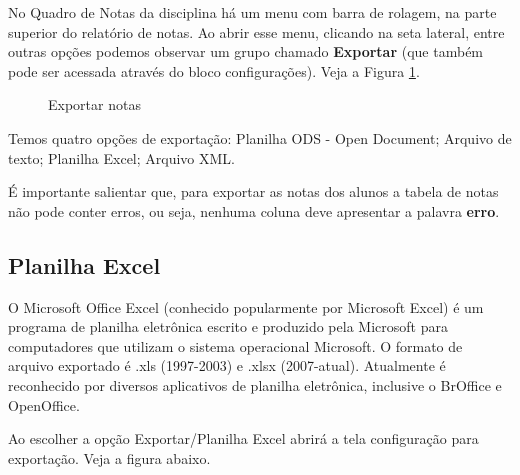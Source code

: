 No Quadro de Notas da disciplina há um menu com barra de rolagem, na parte superior do relatório de notas. Ao abrir esse menu, clicando na seta lateral, entre outras opções podemos observar um grupo chamado \textbf{Exportar} (que também pode ser acessada através do bloco configurações). Veja a Figura \ref{fig:cap6_24}.

 \begin{figure}[htbp]
 \begin{center}
  \caption{Exportar notas}
  \label{fig:cap6_24}
 \end{center}
\end{figure}
Temos quatro opções de exportação: Planilha ODS - Open Document; Arquivo de texto; Planilha Excel; Arquivo XML.

É importante salientar que, para exportar as notas dos alunos a tabela de notas não pode conter erros, ou seja, nenhuma coluna deve apresentar a palavra \textbf{erro}.

\subsection{Planilha Excel}
O Microsoft Office Excel (conhecido popularmente por Microsoft Excel) é um programa de planilha eletrônica escrito e produzido pela Microsoft para computadores que utilizam o sistema operacional Microsoft. O formato de arquivo exportado é .xls (1997-2003) e .xlsx (2007-atual). Atualmente é reconhecido por diversos aplicativos de planilha eletrônica, inclusive o BrOffice e OpenOffice.

Ao escolher a opção Exportar/Planilha Excel abrirá a tela configuração para exportação. Veja a figura abaixo.

